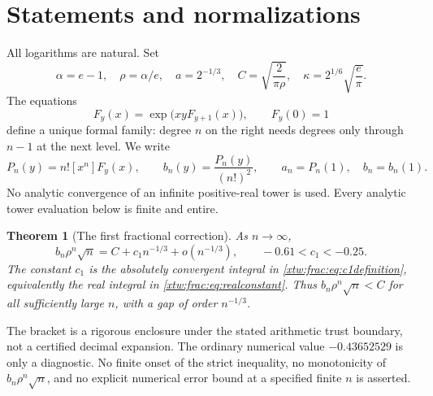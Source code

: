 \documentclass[11pt]{article}
\newtheorem{theorem}{Theorem}[section]
\theoremstyle{remark}\newtheorem{remark}[theorem]{Remark}
\begin{document}
\section{Statements and normalizations}\label{xtw:frac:sec:statements}
All logarithms are natural. Set
\begin{equation}\label{xtw:frac:eq:constants}
 \alpha=e-1,\quad \rho=\alpha/e,\quad a=2^{-1/3},\quad
 C=\sqrt{\frac2{\pi\rho}},\quad
 \kappa=2^{1/6}\sqrt{\frac e\pi}.
\end{equation}
The equations
\begin{equation}\label{xtw:frac:eq:family}
 F_y(x)=\exp\bigl(xyF_{y+1}(x)\bigr),\qquad F_y(0)=1
\end{equation}
define a unique formal family: degree $n$ on the right needs degrees only
through $n-1$ at the next level. We write
\[
 P_n(y)=n![x^n]F_y(x),\qquad b_n(y)=\frac{P_n(y)}{(n!)^2},
 \qquad a_n=P_n(1),\quad b_n=b_n(1).
\]
No analytic convergence of an infinite positive-real tower is used.
Every analytic tower evaluation below is finite and entire.

\begin{theorem}[The first fractional correction]\label{xtw:frac:thm:correction}
As $n\to\infty$,
\begin{equation}\label{xtw:frac:eq:main}
 b_n\rho^n\sqrt n=C+c_1n^{-1/3}+o(n^{-1/3}),
 \qquad -0.61<c_1<-0.25.
\end{equation}
The constant $c_1$ is the absolutely convergent integral in
\eqref{xtw:frac:eq:c1definition}, equivalently the real integral in
\eqref{xtw:frac:eq:realconstant}. Thus $b_n\rho^n\sqrt n<C$ for all sufficiently
large $n$, with a gap of order $n^{-1/3}$.
\end{theorem}
The bracket is a rigorous enclosure under the stated arithmetic trust
boundary, not a certified decimal expansion. The ordinary numerical value
$-0.43652529$ is only a diagnostic. No finite onset of the strict inequality,
no monotonicity of $b_n\rho^n\sqrt n$, and no explicit numerical error bound at a specified finite $n$
is asserted.
\end{document}
